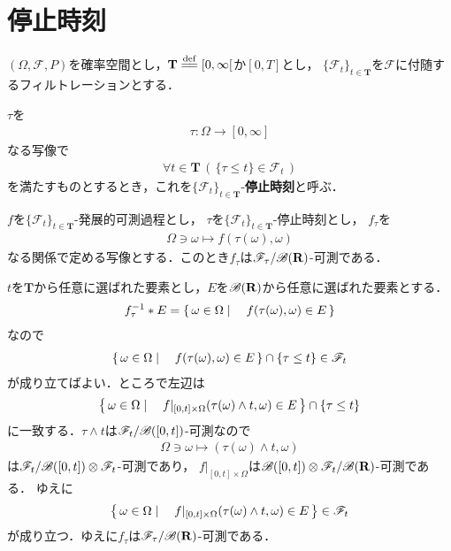 \section{停止時刻}
	$(\Omega,\mathscr{F},P)$を確率空間とし，$\mathbf{T} \defeq [0,\infty[$か$[0,T]$とし，
	$\{\mathscr{F}_t\}_{t \in \mathbf{T}}$を$\mathscr{F}$に付随するフィルトレーションとする．
	
	$\tau$を
	\begin{align}
		\tau:\Omega \longrightarrow [0,\infty]
	\end{align}
	なる写像で
	\begin{align}
		\forall t \in \mathbf{T}\, \left(\, \{\tau \leq t\} \in \mathscr{F}_t\, \right)
	\end{align}
	を満たすものとするとき，これを$\{\mathscr{F}_t\}_{t \in \mathbf{T}}$-{\bf 停止時刻}と呼ぶ．
	
	\begin{screen}
		\begin{thm}[発展的可測過程と停止時刻の合成の可測性]
		\label{thm:composition_of_progressively_measurable_process_and_stopping_time}
			$f$を$\{\mathscr{F}_t\}_{t \in \mathbf{T}}$-発展的可測過程とし，
			$\tau$を$\{\mathscr{F}_t\}_{t \in \mathbf{T}}$-停止時刻とし，
			$f_\tau$を
			\begin{align}
				\Omega \ni \omega \longmapsto f(\tau(\omega),\omega)
			\end{align}
			なる関係で定める写像とする．このとき$f_\tau$は$\mathscr{F}_\tau/\mathscr{B}(\mathbf{R})$-可測である．
		\end{thm}
	\end{screen}
	
	\begin{sketch}
		$t$を$\mathbf{T}$から任意に選ばれた要素とし，$E$を$\mathscr{B}(\mathbf{R})$から任意に選ばれた要素とする．
		\begin{align}
			f_\tau^{-1} \ast E = \left\{\, \omega \in \Omega \mid \quad f(\tau(\omega),\omega) \in E\, \right\} 
		\end{align}
		なので
		\begin{align}
			\left\{\, \omega \in \Omega \mid \quad f(\tau(\omega),\omega) \in E\, \right\} \cap \{\tau \leq t\}
			\in \mathscr{F}_t
		\end{align}
		が成り立てばよい．ところで左辺は
		\begin{align}
			\left\{\, \omega \in \Omega \mid \quad f|_{[0,t] \times \Omega}(\tau(\omega) \wedge t,\omega) \in E\, \right\} \cap \{\tau \leq t\}
		\end{align}
		に一致する．$\tau \wedge t$は$\mathscr{F}_t/\mathscr{B}([0,t])$-可測なので
		\begin{align}
			\Omega \ni \omega \longmapsto (\tau(\omega) \wedge t,\omega)
		\end{align}
		は$\mathscr{F}_t/\mathscr{B}([0,t]) \otimes \mathscr{F}_t$-可測であり，
		$f|_{[0,t] \times \Omega}$は$\mathscr{B}([0,t]) \otimes \mathscr{F}_t/\mathscr{B}(\mathbf{R})$-可測である．
		ゆえに
		\begin{align}
			\left\{\, \omega \in \Omega \mid \quad f|_{[0,t] \times \Omega}(\tau(\omega) \wedge t,\omega) \in E\, \right\} \in \mathscr{F}_t
		\end{align}
		が成り立つ．ゆえに$f_\tau$は$\mathscr{F}_\tau/\mathscr{B}(\mathbf{R})$-可測である．
		\QED
	\end{sketch}
	
	\begin{screen}
		\begin{thm}[任意抽出定理]
			
		\end{thm}
	\end{screen}
	